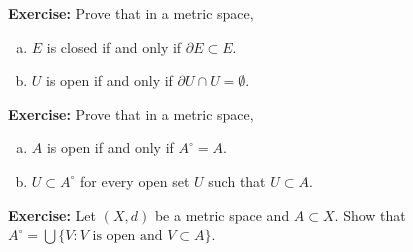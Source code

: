 \documentclass[10pt,aspectratio=169]{beamer}
\begin{document}
\begin{frame}

\textbf{Exercise:}
Prove that in a metric space,
\begin{enumerate}[a)]
\item
\pause
$E$ is closed if and only if $\partial E \subset E$.
\item
\pause
$U$ is open if and only if $\partial U \cap U = \emptyset$.
\end{enumerate}

\pause
\medskip

\textbf{Exercise:}
Prove that in a metric space,
\begin{enumerate}[a)]
\pause
\item
$A$ is open if and only if $A^\circ = A$.
\pause
\item
$U \subset A^\circ$
for every open set $U$ such that $U \subset A$.
\end{enumerate}

\pause
\medskip

\textbf{Exercise:}
Let $(X,d)$ be a metric space and $A \subset X$.  Show that
$A^\circ = \bigcup \{ V : V \text{ is open and } V \subset A \}$.

\end{frame}
\end{document}
